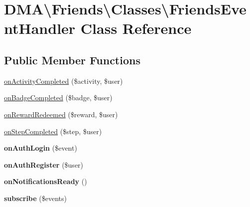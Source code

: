 \hypertarget{classDMA_1_1Friends_1_1Classes_1_1FriendsEventHandler}{}\section{D\+M\+A\textbackslash{}Friends\textbackslash{}Classes\textbackslash{}Friends\+Event\+Handler Class Reference}
\label{classDMA_1_1Friends_1_1Classes_1_1FriendsEventHandler}
\subsection*{Public Member Functions}
\begin{DoxyCompactItemize}
\item 
\hyperlink{classDMA_1_1Friends_1_1Classes_1_1FriendsEventHandler_a6467365017b9d494122c8ded41a9a406}{on\+Activity\+Completed} (\$activity, \$user)
\item 
\hyperlink{classDMA_1_1Friends_1_1Classes_1_1FriendsEventHandler_aa13c2568369d06c2a0ca1c96f099ff09}{on\+Badge\+Completed} (\$badge, \$user)
\item 
\hyperlink{classDMA_1_1Friends_1_1Classes_1_1FriendsEventHandler_aeb8499a09334c87311a7f5840c43685a}{on\+Reward\+Redeemed} (\$reward, \$user)
\item 
\hyperlink{classDMA_1_1Friends_1_1Classes_1_1FriendsEventHandler_a3a99cae5eaa37efa395ef4fe8eb30c11}{on\+Step\+Completed} (\$step, \$user)
\item 
\hypertarget{classDMA_1_1Friends_1_1Classes_1_1FriendsEventHandler_a480d5807466962402ccc13260cfb0930}{}{\bfseries on\+Auth\+Login} (\$event)\label{classDMA_1_1Friends_1_1Classes_1_1FriendsEventHandler_a480d5807466962402ccc13260cfb0930}

\item 
\hypertarget{classDMA_1_1Friends_1_1Classes_1_1FriendsEventHandler_aa1d57544bd13c8acf91a3f4e3bf150a5}{}{\bfseries on\+Auth\+Register} (\$user)\label{classDMA_1_1Friends_1_1Classes_1_1FriendsEventHandler_aa1d57544bd13c8acf91a3f4e3bf150a5}

\item 
\hypertarget{classDMA_1_1Friends_1_1Classes_1_1FriendsEventHandler_ac411d3e487b4a16bd3116f3abf1e38a7}{}{\bfseries on\+Notifications\+Ready} ()\label{classDMA_1_1Friends_1_1Classes_1_1FriendsEventHandler_ac411d3e487b4a16bd3116f3abf1e38a7}

\item 
\hypertarget{classDMA_1_1Friends_1_1Classes_1_1FriendsEventHandler_a92cad97622be6dd1ed477dcc05d81074}{}{\bfseries subscribe} (\$events)\label{classDMA_1_1Friends_1_1Classes_1_1FriendsEventHandler_a92cad97622be6dd1ed477dcc05d81074}

\end{DoxyCompactItemize}



